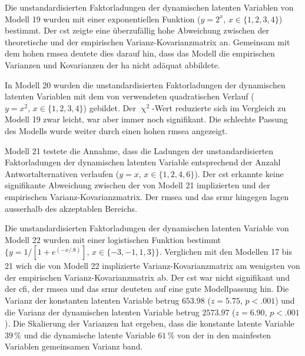 \documentclass[11pt, twoside, a4paper]{book}		%
\begin{document}
Die unstandardisierten Faktorladungen der dynamischen latenten Variablen von Modell 19 wurden mit einer exponentiellen Funktion ($y=2^x,\,x\in\{1, 2, 3, 4\}$) bestimmt. Der \gls{cst} zeigte eine überzufällig hohe Abweichung zwischen der theoretische und der empirischen Var\-ianz-Ko\-var\-ianz\-ma\-trix an. Gemeinsam mit dem hohen \gls{rmsea} deutete dies darauf hin, dass das Modell die empirischen Varianzen und Kovarianzen der \gls{ha} nicht adäquat abbildete.

In Modell 20 wurden die unstandardisierten Faktorladungen der dynamischen latenten Variablen mit dem von \citet{Schweizer2006a} verwendeten quadratischen Verlauf ($y=x^2,\,x\in\{1, 2, 3, 4\}$) gebildet. Der $\upchi^2$-Wert reduzierte sich im Vergleich zu Modell 19 zwar leicht, war aber immer noch signifikant. Die schlechte Passung des Modells wurde weiter durch einen hohen \gls{rmsea} angezeigt.

Modell 21 testete die Annahme, dass die Ladungen der unstandardisierten Faktorladungen der dynamischen latenten Variable entsprechend der Anzahl Antwortalternativen verlaufen ($y=x,\,x\in\{1, 2, 4, 6\}$). Der \gls{cst} erkannte keine signifikante Abweichung zwischen der von Modell 21 implizierten und der empirischen Var\-ianz-Ko\-var\-ianz\-ma\-trix. Der \gls{rmsea} und das \gls{srmr} hingegen lagen ausserhalb des akzeptablen Bereichs.

Die unstandardisierten Faktorladungen der dynamischen latenten Variable von Modell 22 wurden mit einer logistischen Funktion bestimmt $\{y={1}/[{1 + e^{(-x/.8)}}],\,x\in\{-3,-1,1,3\}\}$. Verglichen mit den Modellen 17 bis 21 wich die von Modell 22 implizierte Var\-ianz-Ko\-var\-ianz\-ma\-trix am wenigsten von der empirischen Var\-ianz-Ko\-var\-ianz\-ma\-trix ab. Der \gls{cst} war nicht signifikant und der \gls{cfi}, der \gls{rmsea} und das \gls{srmr} deuteten auf eine gute Modellpassung hin. 
Die Varianz der konstanten latenten Variable betrug $653.98$ ($z=5.75$, $p<.001$) und die Varianz der dynamischen latenten Variable betrug $2573.97$ ($z=6.90$, $p<.001$). Die Skalierung der Varianzen \citep{Schweizer2011a} hat ergeben, dass die konstante latente Variable $39\,\%$ und die dynamische latente Variable $61\,\%$ von der in den mainfesten Variablen gemeinsamen Varianz band.
\end{document}
